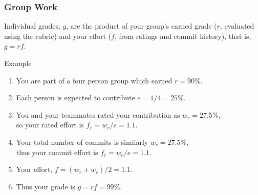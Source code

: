 \begin{frame}
  \frametitle{Group Work}

  Individual grades, \(g\), are the product of your group's earned grade (\(r\), evaluated using the rubric) and your effort (\(f\), from ratings and commit history), that is, \(g = rf\).

  \pause
  \begin{block}{Example}
    \begin{enumerate}[<+->]
    \item You are part of a four person group which earned \(r = 90\%\).
    \item Each person is expected to contribute \(e = 1/4 = 25\%\).
    \item You and your teammates rated your contribution as \(w_{r} = 27.5\%\),\\ so your rated effort is \(f_{r} = w_{r} / e = 1.1\).
    \item Your total number of commits is similarly \(w_{c} = 27.5\%\),\\ thus your commit effort is \(f_{c} = w_{c} / e =  1.1\).
    \item Your effort, \(f = (w_{r} + w_{c}) / 2 = 1.1\).
    \item Thus your grade is \(g = rf = 99\%\).
    \end{enumerate}
  \end{block}

  
\end{frame}

